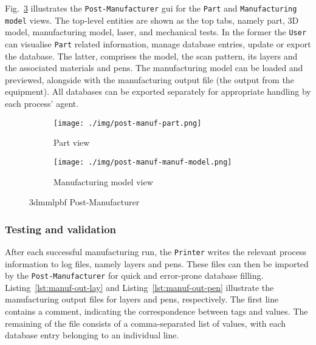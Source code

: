 Fig.~\ref{fig:post-manuf-sw} illustrates the \texttt{Post-Manufacturer}
\gls{gui} for the \texttt{Part} and \texttt{Manufacturing model} views.
The top-level
entities are shown as the top tabs, namely part, 3D model, manufacturing model,
laser, and mechanical tests.
In the
former the \texttt{User} can visualise \texttt{Part} related information, manage
database entries, update or export the database. The latter,
comprises the model, the scan pattern, its layers and the associated materials
and pens. The manufacturing model can be loaded and previewed, alongside with
the manufacturing output file (the output from the equipment).
All databases can be exported separately for appropriate handling by each process' agent.
%
\begin{figure}[htb!]
  \centering
  \begin{subfigure}[t]{.70\textwidth}
    \texttt{[image: ./img/post-manuf-part.png]}
  \caption{Part view}%
  \label{fig:post-manuf-sw-1}
  \end{subfigure}
%
  \begin{subfigure}[t]{.70\textwidth}
    \texttt{[image: ./img/post-manuf-manuf-model.png]}
  \caption{Manufacturing model view}%
  \label{fig:post-manuf-sw-2}
  \end{subfigure}
  \caption{\gls{3dmmlpbf} Post-Manufacturer}%
  \label{fig:post-manuf-sw}
\end{figure}

\subsubsection{Testing and validation}%
\label{sec:testing-validation-postManuf}
After each successful manufacturing run, the \texttt{Printer} writes the
relevant process information to log files, namely layers and pens. These files
can then be imported by the \texttt{Post-Manufacturer} for quick and error-prone
database filling. Listing~\ref{lst:manuf-out-lay} and
Listing~\ref{lst:manuf-out-pen} illustrate the manufacturing output files for
layers and pens, respectively. The first line contains a comment, indicating the
correspondence between tags and values. The remaining of the file consists of a
comma-separated list of values, with each database entry belonging to an individual line. 
%
%

%
%

